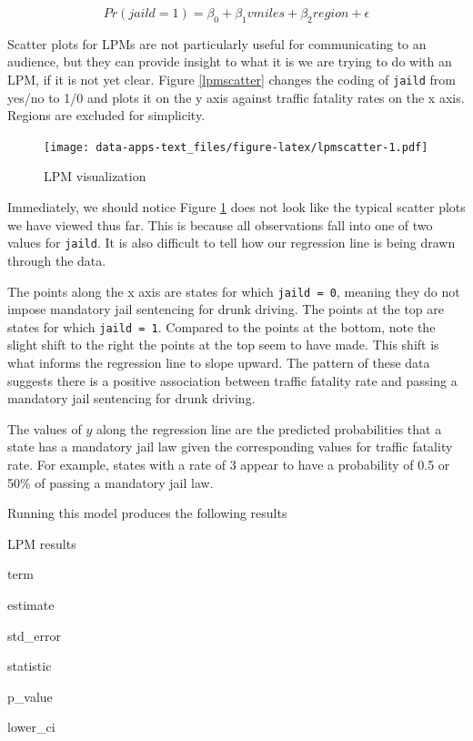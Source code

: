\documentclass[
]{book}
\begin{document}
\begin{equation}
Pr(jaild=1)=\beta_0+\beta_1vmiles+\beta_2region+\epsilon
\label{eq:lpmex}
\end{equation}

Scatter plots for LPMs are not particularly useful for communicating to an audience, but they can provide insight to what it is we are trying to do with an LPM, if it is not yet clear. Figure \ref{lpmscatter} changes the coding of \texttt{jaild} from yes/no to 1/0 and plots it on the y axis against traffic fatality rates on the x axis. Regions are excluded for simplicity.

\begin{figure}
\centering
\texttt{[image: data-apps-text\_files/figure-latex/lpmscatter-1.pdf]}
\caption{\label{fig:lpmscatter}LPM visualization}
\end{figure}

Immediately, we should notice Figure \ref{fig:lpmscatter} does not look like the typical scatter plots we have viewed thus far. This is because all observations fall into one of two values for \texttt{jaild}. It is also difficult to tell how our regression line is being drawn through the data.

The points along the x axis are states for which \texttt{jaild\ =\ 0}, meaning they do not impose mandatory jail sentencing for drunk driving. The points at the top are states for which \texttt{jaild\ =\ 1}. Compared to the points at the bottom, note the slight shift to the right the points at the top seem to have made. This shift is what informs the regression line to slope upward. The pattern of these data suggests there is a positive association between traffic fatality rate and passing a mandatory jail sentencing for drunk driving.

The values of \(y\) along the regression line are the predicted probabilities that a state has a mandatory jail law given the corresponding values for traffic fatality rate. For example, states with a rate of 3 appear to have a probability of 0.5 or 50\% of passing a mandatory jail law.

Running this model produces the following results

\label{tab:lpmresults}LPM results

term

estimate

std\_error

statistic

p\_value

lower\_ci
\end{document}
